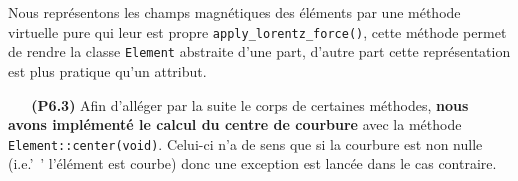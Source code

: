 \documentclass[12pt, letterpaper, twoside]{article}
\newcommand{\T}[1]{\texttt{#1}}
\begin{document}
\begin{comment}
\indent On peut enfin définir les sous-classes \T{Electric\_field} et \T{Magnetic\_field} en rajoutant un attribut de type \T{VectorField} correspondant au champ électrique et magnétique respectivement. Munis de cette représentation, l'implémentation des sous-classes spécifiques d'\T{Element} devient très concise. À l'encontre de la première approche, nous n'avons pas à redéfinir de méthode virtuelle ; il suffit d'ajouter en attribut les éventuels paramètres spécifiques de l'élément puis d'écrire le calcul du champ électrique (resp. magnétique) dans le corps d'un lambda représentant le champ vectoriel que l'on passe en argument (parmi d'autres) au constructeur de \T{Electric\_element} (resp. \T{Magnetic\_element}).\\ \indent Illustrons ceci par la définition simplifiée de la classe représentant les dipôles (qui, rappelons-le, ont un champ magnétique vertical constant, d'amplitude donnée par un paramètre) :
\begin{align*}
	&\T{class Dipole : public Magnetic\_field \{}\\
	&\indent \T{private:}\\
	& \indent \indent \T{double B\_0; // amplitude (signée) du champ constant}\\
	&\indent \T{public:}\\
	& \indent \indent \T{Dipole(parametres\_generiques, double amplitude)} :\\
	& \indent \indent \T{Magnetic\_element( // constructeur de la super-classe}\\
	& \indent \indent \indent \T{attributs\_generiques(parametres\_generiques),}\\
	& \indent \indent \indent \T{// affectation du champ via un lambda :}\\
	& \indent \indent \indent \T{B([](Vector3D \&)\{ return Vector3D(0.0, 0.0, amplitude); \} }\\
	& \indent \indent \T{),}\\
	& \indent \indent \T{B\_0(amplitude)\{\}}\\
	& \T{\};}
\end{align*}
\end{comment}
Nous représentons les champs magnétiques des éléments par une méthode virtuelle pure qui leur est propre \T{apply\_lorentz\_force()}, cette méthode permet de rendre la classe \T{Element} abstraite d'une part, d'autre part cette représentation est plus pratique qu'un attribut. 

\ \linebreak
\ \linebreak
\textbf{(P6.3)} Afin d'alléger par la suite le corps de certaines méthodes, \textbf{nous avons implémenté le calcul du centre de courbure} avec la méthode \T{Element::center(void)}. Celui-ci n'a de sens que si la courbure est non nulle (i.e.'\ ' l'élément est courbe) donc une exception est lancée dans le cas contraire.
\end{document}
